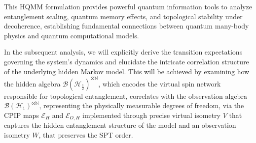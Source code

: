 \documentclass[12pt,a4paper]{article}
\begin{document}
\begin{center}
 \end{center}

  This HQMM formulation provides powerful quantum information tools to analyze entanglement scaling, quantum memory effects, and topological stability under decoherence, establishing fundamental connections between quantum many-body physics and quantum computational models.

In the subsequent analysis, we will explicitly derive the transition expectations governing the system's dynamics and elucidate the intricate correlation structure of the underlying hidden Markov model. This will be achieved by examining how the hidden algebra $\mathcal{B}(\mathcal{H}_{\frac{1}{2}})^{\otimes \mathbb{N}}$, which encodes the virtual spin network responsible for topological entanglement, correlates with the observation algebra $\mathcal{B}(\mathcal{H}_{1})^{\otimes \mathbb{N}}$, representing the physically measurable degrees of freedom, via the CPIP maps $\mathcal{E}_H$ and $\mathcal{E}_{O,H}$ implemented through precise virtual isometry $V$ that captures the hidden entanglement structure of the model and  an observation isometry $W$, that preserves the SPT order.
\end{document}
